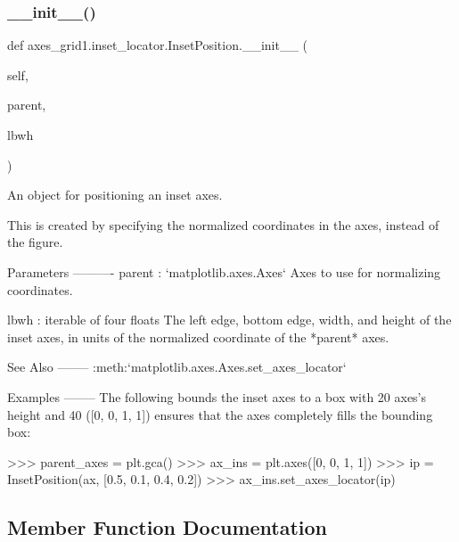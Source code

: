 \subsubsection{\texorpdfstring{\+\_\+\+\_\+init\+\_\+\+\_\+()}{\_\_init\_\_()}}
{\footnotesize\ttfamily def axes\+\_\+grid1.\+inset\+\_\+locator.\+Inset\+Position.\+\_\+\+\_\+init\+\_\+\+\_\+ (\begin{DoxyParamCaption}\item[{}]{self,  }\item[{}]{parent,  }\item[{}]{lbwh }\end{DoxyParamCaption})}

\begin{DoxyVerb}An object for positioning an inset axes.

This is created by specifying the normalized coordinates in the axes,
instead of the figure.

Parameters
----------
parent : `matplotlib.axes.Axes`
    Axes to use for normalizing coordinates.

lbwh : iterable of four floats
    The left edge, bottom edge, width, and height of the inset axes, in
    units of the normalized coordinate of the *parent* axes.

See Also
--------
:meth:`matplotlib.axes.Axes.set_axes_locator`

Examples
--------
The following bounds the inset axes to a box with 20%
axes's height and 40%
([0, 0, 1, 1]) ensures that the axes completely fills the bounding box:

>>> parent_axes = plt.gca()
>>> ax_ins = plt.axes([0, 0, 1, 1])
>>> ip = InsetPosition(ax, [0.5, 0.1, 0.4, 0.2])
>>> ax_ins.set_axes_locator(ip)
\end{DoxyVerb}
 

\subsection{Member Function Documentation}
\mbox{\label{classaxes__grid1_1_1inset__locator_1_1InsetPosition_a442ce8d8df64d55c0a939fcf52db759f}} 

